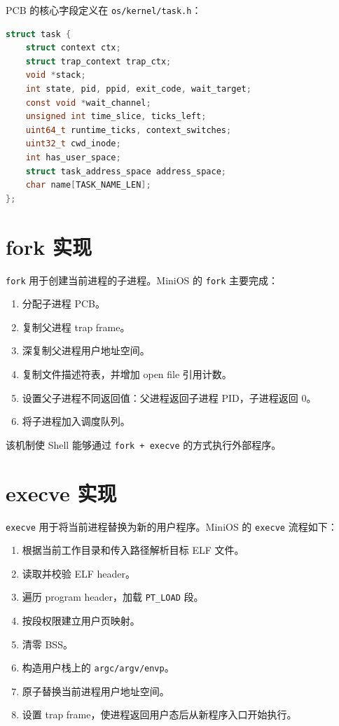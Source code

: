 \documentclass[UTF8,a4paper,12pt,openany,fontset=fandol]{ctexrep}
\begin{document}
PCB 的核心字段定义在 \nolinkurl{os/kernel/task.h}：

\begin{lstlisting}[language=c]
struct task {
    struct context ctx;
    struct trap_context trap_ctx;
    void *stack;
    int state, pid, ppid, exit_code, wait_target;
    const void *wait_channel;
    unsigned int time_slice, ticks_left;
    uint64_t runtime_ticks, context_switches;
    uint32_t cwd_inode;
    int has_user_space;
    struct task_address_space address_space;
    char name[TASK_NAME_LEN];
};
\end{lstlisting}

\section{fork 实现}

\nolinkurl{fork} 用于创建当前进程的子进程。MiniOS 的 \nolinkurl{fork} 主要完成：

\begin{enumerate}
\item 分配子进程 PCB。
\item 复制父进程 trap frame。
\item 深复制父进程用户地址空间。
\item 复制文件描述符表，并增加 open file 引用计数。
\item 设置父子进程不同返回值：父进程返回子进程 PID，子进程返回 0。
\item 将子进程加入调度队列。
\end{enumerate}

该机制使 Shell 能够通过 \nolinkurl{fork + execve} 的方式执行外部程序。

\section{execve 实现}

\nolinkurl{execve} 用于将当前进程替换为新的用户程序。MiniOS 的 \nolinkurl{execve} 流程如下：

\begin{enumerate}
\item 根据当前工作目录和传入路径解析目标 ELF 文件。
\item 读取并校验 ELF header。
\item 遍历 program header，加载 \nolinkurl{PT_LOAD} 段。
\item 按段权限建立用户页映射。
\item 清零 BSS。
\item 构造用户栈上的 \nolinkurl{argc/argv/envp}。
\item 原子替换当前进程用户地址空间。
\item 设置 trap frame，使进程返回用户态后从新程序入口开始执行。
\end{enumerate}
\end{document}
